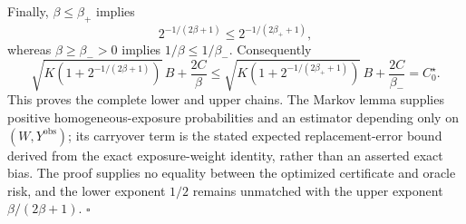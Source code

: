 Finally, \(\beta\le\beta_+\) implies
\[
2^{-1/(2\beta+1)}\le2^{-1/(2\beta_++1)},
\]
whereas \(\beta\ge\beta_->0\) implies \(1/\beta\le1/\beta_-\). Consequently
\[
\sqrt{K\left(1+2^{-1/(2\beta+1)}\right)}\,B+\frac{2C}{\beta}
\le
\sqrt{K\left(1+2^{-1/(2\beta_++1)}\right)}\,B+\frac{2C}{\beta_-}
=C_0^\star.
\]
This proves the complete lower and upper chains. The Markov lemma supplies positive homogeneous-exposure probabilities and an estimator depending only on \((W,Y^{\mathrm{obs}})\); its carryover term is the stated expected replacement-error bound derived from the exact exposure-weight identity, rather than an asserted exact bias. The proof supplies no equality between the optimized certificate and oracle risk, and the lower exponent \(1/2\) remains unmatched with the upper exponent \(\beta/(2\beta+1)\). \(\square\)